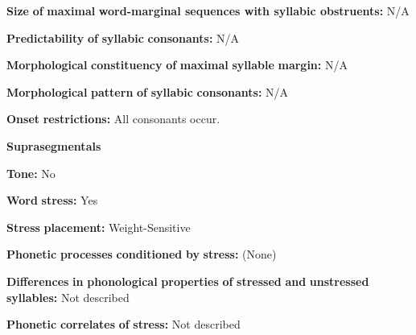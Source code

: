 \begin{styleBody}
\textbf{Size} \textbf{of} \textbf{maximal} \textbf{word{}-marginal sequences with syllabic obstruents:} N/A
\end{styleBody}

\begin{styleBody}
\textbf{Predictability} \textbf{of} \textbf{syllabic} \textbf{consonants:} N/A
\end{styleBody}

\begin{styleBody}
\textbf{Morphological} \textbf{constituency} \textbf{of} \textbf{maximal} \textbf{syllable} \textbf{margin:} N/A
\end{styleBody}

\begin{styleBody}
\textbf{Morphological} \textbf{pattern} \textbf{of} \textbf{syllabic} \textbf{consonants:} N/A
\end{styleBody}

\begin{styleBody}
\textbf{Onset} \textbf{restrictions:} All consonants occur.
\end{styleBody}

\begin{styleBody}
\textbf{Suprasegmentals}
\end{styleBody}

\begin{styleBody}
\textbf{Tone:} No
\end{styleBody}

\begin{styleBody}
\textbf{Word} \textbf{stress:} Yes
\end{styleBody}

\begin{styleBody}
\textbf{Stress} \textbf{placement:} Weight-Sensitive
\end{styleBody}

\begin{styleBody}
\textbf{Phonetic} \textbf{processes} \textbf{conditioned} \textbf{by} \textbf{stress:} (None)
\end{styleBody}

\begin{styleBody}
\textbf{Differences} \textbf{in} \textbf{phonological} \textbf{properties} \textbf{of} \textbf{stressed} \textbf{and} \textbf{unstressed} \textbf{syllables:} Not described
\end{styleBody}

\begin{styleBody}
\textbf{Phonetic} \textbf{correlates} \textbf{of} \textbf{stress:} Not described
\end{styleBody}

